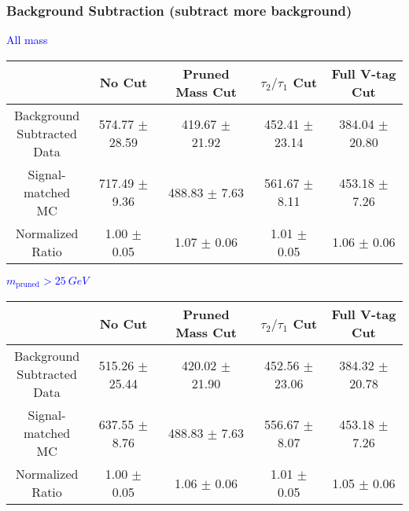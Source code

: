 \documentclass{beamer}
\begin{document}
\begin{frame}
  \frametitle{Background Subtraction (subtract more background)}
  \begin{adjustwidth}{-1.5em}{-1.5em}
    \centering
    \vspace{6pt}
    \textcolor{blue}{All mass}
    \vspace{6pt}

    {\scriptsize
      \begin{tabular}{c | c | c | c | c}
\hline
 & No Cut & Pruned Mass Cut & $\tau_2/\tau_1$ Cut & Full V-tag Cut \\
\hline
\makecell{Background \\ Subtracted \\ Data} & 574.77 $\pm$ 28.59 & 419.67 $\pm$ 21.92 & 452.41 $\pm$ 23.14 & 384.04 $\pm$ 20.80 \\
\makecell{Signal-\\ matched MC} & 717.49 $\pm$ 9.36 & 488.83 $\pm$ 7.63 & 561.67 $\pm$ 8.11 & 453.18 $\pm$ 7.26 \\
\hline
\makecell{Normalized \\ Ratio} & 1.00 $\pm$ 0.05 & 1.07 $\pm$ 0.06 & 1.01 $\pm$ 0.05 & 1.06 $\pm$ 0.06 \\
\hline
      \end{tabular}
    }

    \vspace{6pt}
    \textcolor{blue}{$m_\text{pruned} > \SI{25}{GeV}$}
    \vspace{6pt}

    {\scriptsize
      \begin{tabular}{c | c | c | c | c}
\hline
 & No Cut & Pruned Mass Cut & $\tau_2/\tau_1$ Cut & Full V-tag Cut \\
\hline
\makecell{Background \\ Subtracted \\ Data} & 515.26 $\pm$ 25.44 & 420.02 $\pm$ 21.90 & 452.56 $\pm$ 23.06 & 384.32 $\pm$ 20.78 \\
\makecell{Signal-\\ matched MC} & 637.55 $\pm$ 8.76 & 488.83 $\pm$ 7.63 & 556.67 $\pm$ 8.07 & 453.18 $\pm$ 7.26 \\
\hline
\makecell{Normalized \\ Ratio} & 1.00 $\pm$ 0.05 & 1.06 $\pm$ 0.06 & 1.01 $\pm$ 0.05 & 1.05 $\pm$ 0.06 \\
\hline
      \end{tabular}
    }
  \end{adjustwidth}
\end{frame}
\end{document}
